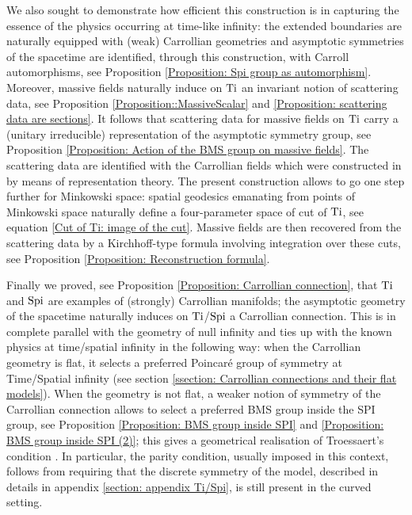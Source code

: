 \documentclass[a4paper, 10pt]{article}
\theoremstyle{remark}
\newcommand{\Ti}{\textnormal{Ti}}
\newcommand{\Spi}{\textnormal{Spi}}
\begin{document}
We also sought to demonstrate how efficient this construction is in capturing the essence of the physics occurring at time-like infinity: the extended boundaries are naturally equipped with  (weak) Carrollian geometries and asymptotic symmetries of the spacetime are identified, through this construction, with Carroll automorphisms, see Proposition \ref{Proposition: Spi group as automorphism}. Moreover, massive fields naturally induce on $\Ti$ an invariant notion of scattering data, see Proposition \ref{Proposition::MassiveScalar} and \ref{Proposition: scattering data are sections}. It follows that scattering data for massive fields on $\Ti$ carry a (unitary irreducible) representation of the asymptotic symmetry group, see Proposition \ref{Proposition: Action of the BMS group on massive fields}. The scattering data are identified with the Carrollian fields which were constructed in \cite{Have:2024dff} by means of representation theory. The present construction allows to go one step further for Minkowski space: spatial geodesics emanating from points of Minkowski space naturally define a four-parameter space of cut of $\Ti$, see equation \eqref{Cut of Ti: image of the cut}. Massive fields are then recovered from the scattering data by a Kirchhoff-type formula involving integration over these cuts, see Proposition \ref{Proposition: Reconstruction formula}.

Finally we proved, see Proposition \ref{Proposition: Carrollian connection}, that $\Ti$ and $\Spi$ are examples of (strongly) Carrollian manifolds; the asymptotic geometry of the spacetime naturally induces on $\Ti$/$\Spi$ a Carrollian connection. This is in complete parallel with the geometry of null infinity \cite{ashtekar_radiative_1981,ashtekar_null_2018,Herfray:2021qmp} and ties up with the known physics at time/spatial infinity in the following way: when the Carrollian geometry is flat, it selects a preferred Poincaré group of symmetry at Time/Spatial infinity (see section \ref{ssection: Carrollian connections and their flat models}). When the geometry is not flat, a weaker notion of symmetry of the Carrollian connection allows to select a preferred BMS group inside the SPI group, see Proposition \ref{Proposition: BMS group inside SPI} and \ref{Proposition: BMS group inside SPI (2)}; this gives a geometrical realisation of Troessaert's condition \cite{troessaert_bms4_2018}. In particular, the parity condition, usually imposed in this context, follows from requiring that the discrete symmetry of the model, described in details in appendix \ref{section: appendix Ti/Spi}, is still present in the curved setting.
\end{document}
